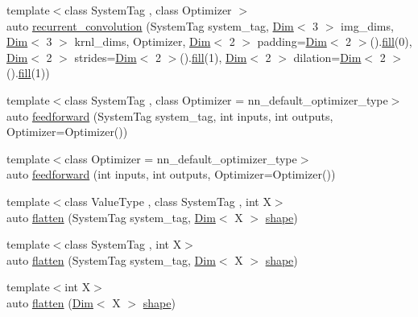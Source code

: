 \begin{DoxyCompactItemize}
\item 
{\footnotesize template$<$class System\+Tag , class Optimizer $>$ }\\auto \hyperlink{namespacebc_1_1nn_af1f206cd72b05e2745666402f91a5b72}{recurrent\+\_\+convolution} (System\+Tag system\+\_\+tag, \hyperlink{structbc_1_1Dim}{Dim}$<$ 3 $>$ img\+\_\+dims, \hyperlink{structbc_1_1Dim}{Dim}$<$ 3 $>$ krnl\+\_\+dims, Optimizer, \hyperlink{structbc_1_1Dim}{Dim}$<$ 2 $>$ padding=\hyperlink{structbc_1_1Dim}{Dim}$<$ 2 $>$().\hyperlink{tensor__iteralgos_8h_afd10a40f252abd24d1faa2752becdd53}{fill}(0), \hyperlink{structbc_1_1Dim}{Dim}$<$ 2 $>$ strides=\hyperlink{structbc_1_1Dim}{Dim}$<$ 2 $>$().\hyperlink{tensor__iteralgos_8h_afd10a40f252abd24d1faa2752becdd53}{fill}(1), \hyperlink{structbc_1_1Dim}{Dim}$<$ 2 $>$ dilation=\hyperlink{structbc_1_1Dim}{Dim}$<$ 2 $>$().\hyperlink{tensor__iteralgos_8h_afd10a40f252abd24d1faa2752becdd53}{fill}(1))
\item 
{\footnotesize template$<$class System\+Tag , class Optimizer  = nn\+\_\+default\+\_\+optimizer\+\_\+type$>$ }\\auto \hyperlink{namespacebc_1_1nn_a2aa178844eb976dd07e0254e5047b897}{feedforward} (System\+Tag system\+\_\+tag, int inputs, int outputs, Optimizer=Optimizer())
\item 
{\footnotesize template$<$class Optimizer  = nn\+\_\+default\+\_\+optimizer\+\_\+type$>$ }\\auto \hyperlink{namespacebc_1_1nn_ab37956d86d4c9663196041a734e4383e}{feedforward} (int inputs, int outputs, Optimizer=Optimizer())
\item 
{\footnotesize template$<$class Value\+Type , class System\+Tag , int X$>$ }\\auto \hyperlink{namespacebc_1_1nn_ad3ccbb13b94637fc40bcd46d2cd5b1e4}{flatten} (System\+Tag system\+\_\+tag, \hyperlink{structbc_1_1Dim}{Dim}$<$ X $>$ \hyperlink{namespacebc_a1bc6dec532973ac024c738c0fd32cca3}{shape})
\item 
{\footnotesize template$<$class System\+Tag , int X$>$ }\\auto \hyperlink{namespacebc_1_1nn_afcf9752c3b29c98ef665dd710b18c7fd}{flatten} (System\+Tag system\+\_\+tag, \hyperlink{structbc_1_1Dim}{Dim}$<$ X $>$ \hyperlink{namespacebc_a1bc6dec532973ac024c738c0fd32cca3}{shape})
\item 
{\footnotesize template$<$int X$>$ }\\auto \hyperlink{namespacebc_1_1nn_ac038324e88b3931fb3f8fb92b809a4f5}{flatten} (\hyperlink{structbc_1_1Dim}{Dim}$<$ X $>$ \hyperlink{namespacebc_a1bc6dec532973ac024c738c0fd32cca3}{shape})

\end{DoxyCompactItemize}
